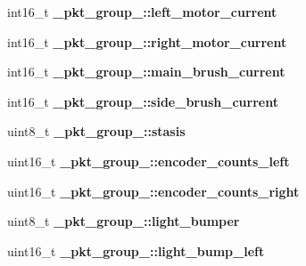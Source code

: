\begin{DoxyCompactItemize}
\item 
\hypertarget{group__roomba-lib_gabcbb278060143cf89a63741267813c40}{}int16\+\_\+t {\bfseries \+\_\+pkt\+\_\+group\+\_\+::left\+\_\+motor\+\_\+current}\label{group__roomba-lib_gabcbb278060143cf89a63741267813c40}

\item 
\hypertarget{group__roomba-lib_ga650e96f7760308678e145f58e15301c6}{}int16\+\_\+t {\bfseries \+\_\+pkt\+\_\+group\+\_\+::right\+\_\+motor\+\_\+current}\label{group__roomba-lib_ga650e96f7760308678e145f58e15301c6}

\item 
\hypertarget{group__roomba-lib_ga5da7c3a4c8e56bd2e359eec4db31bb59}{}int16\+\_\+t {\bfseries \+\_\+pkt\+\_\+group\+\_\+::main\+\_\+brush\+\_\+current}\label{group__roomba-lib_ga5da7c3a4c8e56bd2e359eec4db31bb59}

\item 
\hypertarget{group__roomba-lib_ga480d7a16d91c35b29d80f375d618af8f}{}int16\+\_\+t {\bfseries \+\_\+pkt\+\_\+group\+\_\+::side\+\_\+brush\+\_\+current}\label{group__roomba-lib_ga480d7a16d91c35b29d80f375d618af8f}

\item 
\hypertarget{group__roomba-lib_ga70aafd5ca9d423c9de407f6f3fd1e59d}{}uint8\+\_\+t {\bfseries \+\_\+pkt\+\_\+group\+\_\+::stasis}\label{group__roomba-lib_ga70aafd5ca9d423c9de407f6f3fd1e59d}

\item 
\hypertarget{group__roomba-lib_gac67c2df811fa6b016babff589d49a334}{}uint16\+\_\+t {\bfseries \+\_\+pkt\+\_\+group\+\_\+::encoder\+\_\+counts\+\_\+left}\label{group__roomba-lib_gac67c2df811fa6b016babff589d49a334}

\item 
\hypertarget{group__roomba-lib_gaf241e5ac898f0af032ef9a2fda8435cf}{}uint16\+\_\+t {\bfseries \+\_\+pkt\+\_\+group\+\_\+::encoder\+\_\+counts\+\_\+right}\label{group__roomba-lib_gaf241e5ac898f0af032ef9a2fda8435cf}

\item 
\hypertarget{group__roomba-lib_ga9d8c0585cdfc7fd3b618fc69a747d216}{}uint8\+\_\+t {\bfseries \+\_\+pkt\+\_\+group\+\_\+::light\+\_\+bumper}\label{group__roomba-lib_ga9d8c0585cdfc7fd3b618fc69a747d216}

\item 
\hypertarget{group__roomba-lib_gae55a54b9b25669739aa113d402a4e2d2}{}uint16\+\_\+t {\bfseries \+\_\+pkt\+\_\+group\+\_\+::light\+\_\+bump\+\_\+left}\label{group__roomba-lib_gae55a54b9b25669739aa113d402a4e2d2}


\end{DoxyCompactItemize}
